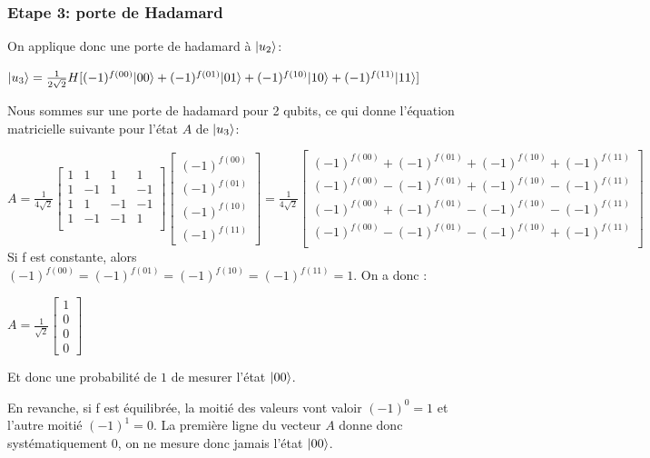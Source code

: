 \documentclass[12pt,a4paper]{article}
\DeclarePairedDelimiter\ket{\lvert}{\rangle}
\begin{document}
\subsubsection{Etape 3: porte de Hadamard}

On applique donc une porte de hadamard à $\ket{u_2}$:

$
\ket{u_3} = \frac{1}{2\sqrt{2}} H [(-1)^{f(00)} \ket{00} + (-1)^{f(01)} \ket{01} + (-1)^{f(10)} \ket{10} + (-1)^{f(11)} \ket{11} ]
$

Nous sommes sur une porte de hadamard pour 2 qubits, ce qui donne l'équation matricielle suivante pour l'état $A$ de $\ket{u_3}$:

$
A=
\frac{1}{4\sqrt{2}} 
\begin{bmatrix}
  1 & 1 & 1 & 1 \\
  1 & -1 & 1 & -1 \\
  1 & 1 & -1 & -1 \\
  1 & -1 & -1 & 1 \\
\end{bmatrix}
\begin{bmatrix}
  (-1)^{f(00)} \\ (-1)^{f(01)} \\ (-1)^{f(10)} \\ (-1)^{f(11)}
\end{bmatrix}=
\frac{1}{4\sqrt{2}} 
\begin{bmatrix}
  (-1)^{f(00)} + (-1)^{f(01)} + (-1)^{f(10)} + (-1)^{f(11)} \\
  (-1)^{f(00)} - (-1)^{f(01)} + (-1)^{f(10)} - (-1)^{f(11)} \\
  (-1)^{f(00)} + (-1)^{f(01)} - (-1)^{f(10)} - (-1)^{f(11)} \\
  (-1)^{f(00)} - (-1)^{f(01)} - (-1)^{f(10)} + (-1)^{f(11)} \\
\end{bmatrix}
$
\medbreak
Si f est constante, alors $(-1)^{f(00)} = (-1)^{f(01)} = (-1)^{f(10)} = (-1)^{f(11)} = 1$. On a donc : 

$
A=
\frac{1}{\sqrt{2}} 
\begin{bmatrix}
  1 \\ 0 \\ 0 \\ 0
\end{bmatrix}
$

Et donc une probabilité de $1$ de mesurer l'état $\ket{00}$.

\medbreak
En revanche, si f est équilibrée, la moitié des valeurs vont valoir $(-1)^{0} = 1$ et l'autre moitié $(-1)^{1} = 0$. La première ligne du vecteur $A$ donne donc systématiquement 0, on ne mesure donc jamais l'état $\ket{00}$.

\medbreak
\end{document}
